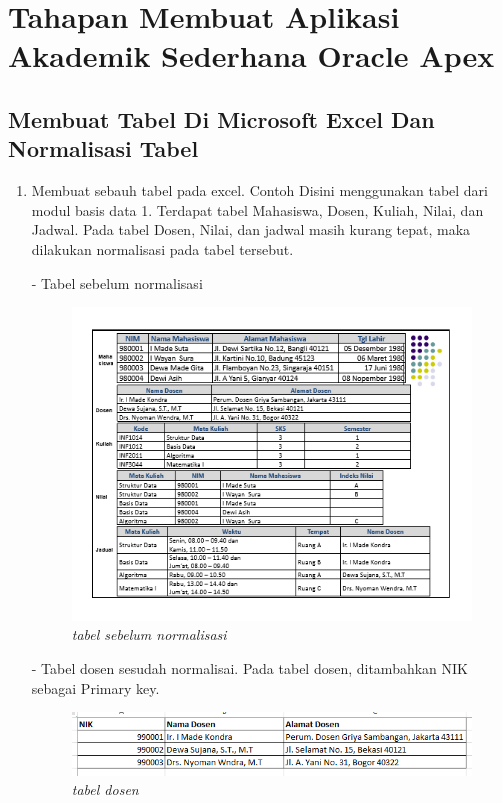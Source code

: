 \chapter{Tahapan Membuat Aplikasi Akademik Sederhana Oracle Apex}

\section{Membuat Tabel Di Microsoft Excel Dan Normalisasi Tabel}
\begin{enumerate}
    \item Membuat sebauh tabel pada excel. Contoh Disini menggunakan tabel dari modul basis data 1. Terdapat tabel Mahasiswa, Dosen, Kuliah, Nilai, dan Jadwal. Pada tabel Dosen, Nilai, dan jadwal masih kurang tepat, maka dilakukan normalisasi pada tabel tersebut.\par
    - Tabel sebelum normalisasi
    
    \begin{figure}[!htbp]
        \centering
        \includegraphics[scale=0.7]{figure/tabel_sebelum_normalisasi.PNG}
        \caption{\textit{tabel sebelum normalisasi}}
        \label{fig:my_label}
    \end{figure}
    
    \par 
    
    - Tabel dosen sesudah normalisai. Pada tabel dosen, ditambahkan NIK sebagai Primary key.\par
    
    \newpage
    \begin{figure}[!htbp]
        \centering
        \includegraphics[scale=0.7]{figure/tabel_dosen.PNG}
        \caption{\textit{tabel dosen}}
        \label{fig:my_label}
    \end{figure}\par
    

\end{enumerate}
